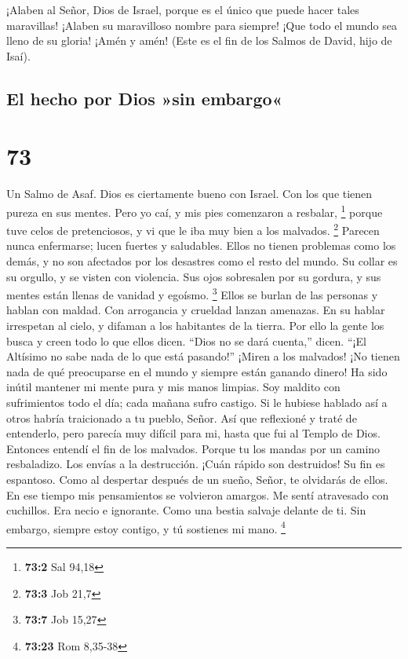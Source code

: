  ¡Alaben al Señor, Dios de Israel, porque es el único que
puede hacer tales maravillas!  ¡Alaben su maravilloso
nombre para siempre! ¡Que todo el mundo sea lleno de su gloria! ¡Amén y
amén!  (Este es el fin de los Salmos de David, hijo de
Isaí).

\hypertarget{el-hecho-por-dios-sin-embargo}{%
\subsection{El hecho por Dios »sin
embargo«}\label{el-hecho-por-dios-sin-embargo}}

\hypertarget{section-72}{%
\section{73}\label{section-72}}

Un Salmo de Asaf.  Dios es ciertamente bueno con Israel. Con
los que tienen pureza en sus mentes.  Pero yo caí, y mis
pies comenzaron a resbalar, \footnote{\textbf{73:2} Sal 94,18}
 porque tuve celos de pretenciosos, y vi que le iba muy bien
a los malvados. \footnote{\textbf{73:3} Job 21,7}  Parecen
nunca enfermarse; lucen fuertes y saludables.  Ellos no
tienen problemas como los demás, y no son afectados por los desastres
como el resto del mundo.  Su collar es su orgullo, y se
visten con violencia.  Sus ojos sobresalen por su gordura, y
sus mentes están llenas de vanidad y egoísmo. \footnote{\textbf{73:7}
  Job 15,27}  Ellos se burlan de las personas y hablan con
maldad. Con arrogancia y crueldad lanzan amenazas.  En su
hablar irrespetan al cielo, y difaman a los habitantes de la tierra.
 Por ello la gente los busca y creen todo lo que ellos
dicen.  ``Dios no se dará cuenta,'' dicen. ``¡El Altísimo
no sabe nada de lo que está pasando!''  ¡Miren a los
malvados! ¡No tienen nada de qué preocuparse en el mundo y siempre están
ganando dinero!  Ha sido inútil mantener mi mente pura y
mis manos limpias.  Soy maldito con sufrimientos todo el
día; cada mañana sufro castigo.  Si le hubiese hablado así
a otros habría traicionado a tu pueblo, Señor.  Así que
reflexioné y traté de entenderlo, pero parecía muy difícil para mi,
 hasta que fui al Templo de Dios. Entonces entendí el fin
de los malvados.  Porque tu los mandas por un camino
resbaladizo. Los envías a la destrucción.  ¡Cuán rápido son
destruidos! Su fin es espantoso.  Como al despertar después
de un sueño, Señor, te olvidarás de ellos.  En ese tiempo
mis pensamientos se volvieron amargos. Me sentí atravesado con
cuchillos.  Era necio e ignorante. Como una bestia salvaje
delante de ti.  Sin embargo, siempre estoy contigo, y tú
sostienes mi mano. \footnote{\textbf{73:23} Rom 8,35-38}

